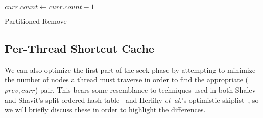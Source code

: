 \documentclass{llncs}
\begin{document}
{\begin{algorithm}
{{{        }
        $curr.count \leftarrow curr.count - 1$ \;
        
        
         {
        }
         \;
    }
}
\caption{Partitioned Remove}
\label{Algorithm:Remove2}
\end{algorithm}
\subsection{Per-Thread Shortcut Cache}
We can also optimize the first part of the seek phase by attempting to minimize the number of nodes a thread must traverse in order to find the appropriate ($prev,curr$) pair.  This bears some resemblance to techniques used in both Shalev and Shavit's split-ordered hash table~\cite{Shalev:SplitOrder} and Herlihy \emph{et~al.}'s optimistic skiplist~\cite{Herlihy:Skiplist1}, so we will briefly discuss these in order to highlight the differences.

}
\end{document}
